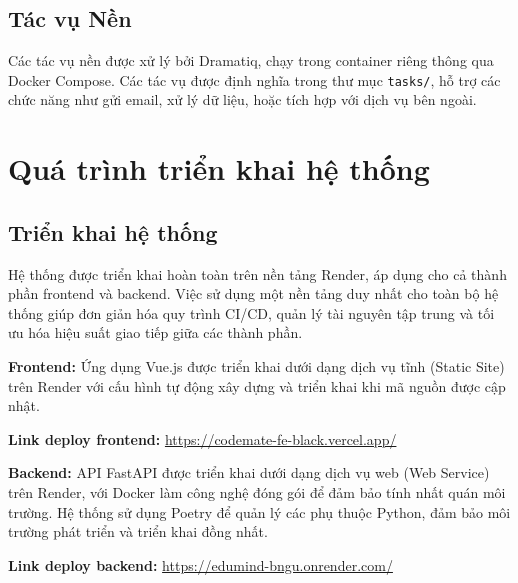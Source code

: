 \subsection*{Tác vụ Nền}

Các tác vụ nền được xử lý bởi Dramatiq, chạy trong container riêng thông qua Docker Compose. Các tác vụ được định nghĩa trong thư mục \texttt{tasks/}, hỗ trợ các chức năng như gửi email, xử lý dữ liệu, hoặc tích hợp với dịch vụ bên ngoài.

\section{Quá trình triển khai hệ thống}
\subsection*{Triển khai hệ thống}

Hệ thống được triển khai hoàn toàn trên nền tảng Render, áp dụng cho cả thành phần frontend và backend. Việc sử dụng một nền tảng duy nhất cho toàn bộ hệ thống giúp đơn giản hóa quy trình CI/CD, quản lý tài nguyên tập trung và tối ưu hóa hiệu suất giao tiếp giữa các thành phần.

\textbf{Frontend:} Ứng dụng Vue.js được triển khai dưới dạng dịch vụ tĩnh (Static Site) trên Render với cấu hình tự động xây dựng và triển khai khi mã nguồn được cập nhật.

\par \textbf{Link deploy frontend:} \textcolor{blue}{\href{https://codemate-fe-black.vercel.app/}{https://codemate-fe-black.vercel.app/}}

\textbf{Backend:} API FastAPI được triển khai dưới dạng dịch vụ web (Web Service) trên Render, với Docker làm công nghệ đóng gói để đảm bảo tính nhất quán môi trường. Hệ thống sử dụng Poetry để quản lý các phụ thuộc Python, đảm bảo môi trường phát triển và triển khai đồng nhất.

\par \textbf{Link deploy backend:} \textcolor{blue}{\href{https://edumind-bngu.onrender.com/}{https://edumind-bngu.onrender.com/}}

